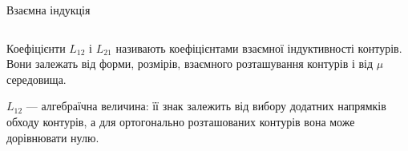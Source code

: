 \documentclass[onlytextwidth]{beamer}
\begin{document}
\begin{frame}{Взаємна індукція}{}
\begin{columns}
	\end{columns}
	\begin{overprint}
		\begin{block}{}\justifying
			Коефіцієнти $L_{12}$ і $L_{21}$ називають \alert{коефіцієнтами взаємної індуктивності} контурів. Вони залежать від форми, розмірів,
			взаємного розташування контурів і від $\mu$ середовища.
		\end{block}
		\begin{block}{}\justifying
			$L_{12}$ --- алгебраїчна величина: її знак залежить від вибору додатних напрямків обходу контурів, а для ортогонально розташованих
			контурів вона може дорівнювати нулю.
		\end{block}
	\end{overprint}
\end{frame}
\end{document}
